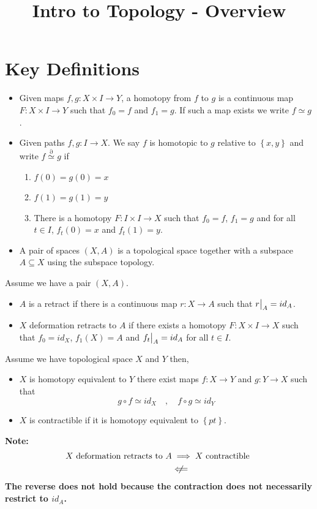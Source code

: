 \documentclass[11pt]{article}
\title{Intro to Topology - Overview}
\author{}
\date{}
\newcommand{\homrel}{\stackrel{\partial}{\simeq}}
\newcommand\restr[2]{{%
  \left.\kern-\nulldelimiterspace %
  #1 %
  \vphantom{\big|} %
  \right|_{#2} %
  }}
\newenvironment{defin}
	{\begin{mdframed}[backgroundcolor=white, roundcorner=5pt, linewidth=1pt]
		\setlength{\parindent}{0pt}
		}
	{\end{mdframed}}
\newcommand{\mdf}[1]{{\color{red} #1}}
\newenvironment{note}
	{\begin{mdframed}[backgroundcolor=white, linecolor=red, roundcorner=5pt, linewidth=1pt]\bfseries{Note:}\normalfont}
	{\end{mdframed}}
\begin{document}
\maketitle

\section{Key Definitions}
\begin{defin}
\begin{itemize}
	 \item Given maps $f,g:X\times I \to Y$, a \mdf{homotopy} from $f$ to $g$ is a continuous map  $F:X\times I \to Y$ such that $f_0=f$ and $f_1=g$.
		 If such a map exists we write $f\simeq g$.
	 \item Given paths $f,g:I \to X$. We say \mdf{$f$ is homotopic to $g$ relative to $\left\{x, y\right\}$} and write $f\homrel g$ if
		 \begin{enumerate}[label=(\roman*)]
			 \item $f(0)=g(0)=x$
			 \item $f(1)=g(1)=y$
			 \item There is a homotopy $F:I\times I \to X$ such that $f_0=f$, $f_1=g$ and for all $t\in I$, $f_t(0)=x$ and $f_t(1)=y$.
		 \end{enumerate}
	 \item A \mdf{pair} of spaces $(X,A)$ is a topological space together with a subspace $A\subseteq X$ using the subspace topology.
\end{itemize}
Assume we have a pair $(X,A)$.
\begin{itemize}
	 \item $A$ is a \mdf{retract} if there is a continuous map $r:X\to A$ such that $\restr{r}{A}=id_A$.
	 \item $X$ \mdf{deformation retracts} to $A$ if there exists a homotopy $F:X\times I \to X$ such that $f_0=id_X$, $f_1(X)=A$ and $\restr{f_t}{A}=id_A$ for all $t\in I$.
\end{itemize}
Assume we have topological space $X$ and $Y$ then,
\begin{itemize}
	\item $X$ is \mdf{homotopy equivalent} to $Y$ there exist maps $f:X\to Y$ and $g:Y\to X$ such that
	\[
g\circ f \simeq id_X \quad , \quad f\circ g \simeq id_Y
	\]
\item $X$ is \mdf{contractible} if it is homotopy equivalent to $\left\{pt\right\}$.
	
\end{itemize}
\end{defin}
\begin{note}
	\begin{align*}
		X \text{ deformation retracts to } A &\implies X \text{ contractible }\\
											 &\centernot\Longleftarrow
	\end{align*}
	The reverse does not hold because the contraction does not necessarily restrict to $id_A$.
\end{note}
\end{document}
